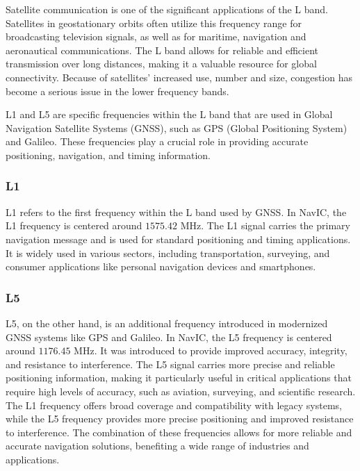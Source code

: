 Satellite communication is one of the significant applications of the L band. Satellites in geostationary orbits often utilize this frequency range for broadcasting television signals, as well as for maritime, navigation and aeronautical communications. The L band allows for reliable and efficient transmission over long distances, making it a valuable resource for global connectivity. Because of satellites’ increased use, number and size, congestion has become a serious issue in the lower frequency bands.

L1 and L5 are specific frequencies within the L band that are used in Global Navigation Satellite Systems (GNSS), such as GPS (Global Positioning System) and Galileo. These frequencies play a crucial role in providing accurate positioning, navigation, and timing information.
\subsubsection{L1} 
L1 refers to the first frequency within the L band used by GNSS. In NavIC, the L1 frequency is centered around $1575.42$ MHz. The L1 signal carries the primary navigation message and is used for standard positioning and timing applications. It is widely used in various sectors, including transportation, surveying, and consumer applications like personal navigation devices and smartphones.
\subsubsection{L5}
L5, on the other hand, is an additional frequency introduced in modernized GNSS systems like GPS and Galileo. In NavIC, the L5 frequency is centered around $1176.45$ MHz. It was introduced to provide improved accuracy, integrity, and resistance to interference. The L5 signal carries more precise and reliable positioning information, making it particularly useful in critical applications that require high levels of accuracy, such as aviation, surveying, and scientific research.
The L1 frequency offers broad coverage and compatibility with legacy systems, while the L5 frequency provides more precise positioning and improved resistance to interference. The combination of these frequencies allows for more reliable and accurate navigation solutions, benefiting a wide range of industries and applications.
